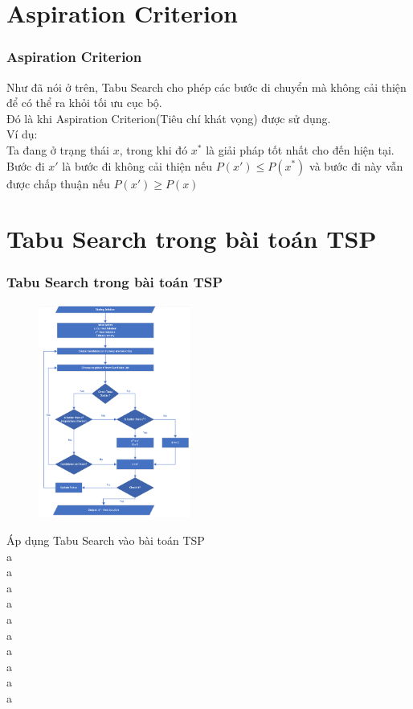 \documentclass[12pt]{beamer}
\begin{document}
	\section{Aspiration Criterion}
	\begin{frame}
		\frametitle{Aspiration Criterion}
		Như đã nói ở trên, Tabu Search cho phép các bước di chuyển mà không cải thiện để có thể ra khỏi tối ưu cục bộ.\\
		Đó là khi Aspiration Criterion(Tiêu chí khát vọng) được sử dụng.\\
		Ví dụ:\\
		Ta đang ở trạng thái $x$, trong khi đó $x^*$ là giải pháp tốt nhất cho đến hiện tại.\\
		Bước đi $x'$ là bước đi không cải thiện nếu $P(x') \le P(x^*)$ và bước đi này vẫn được chấp thuận nếu $P(x') \ge P(x)$
	\end{frame}

	\section{Tabu Search trong bài toán TSP}
	\begin{frame}
		\frametitle{Tabu Search trong bài toán TSP}
			\begin{figure}
				\includegraphics[width=5cm]{Tabu.png}
			\end{figure}
		Áp dụng Tabu Search vào bài toán TSP\\
		a\\
		a\\
		a\\
		a\\
		a\\
		a\\
		a\\
		a\\
		a\\
		a\\
	\end{frame}
\end{document}
